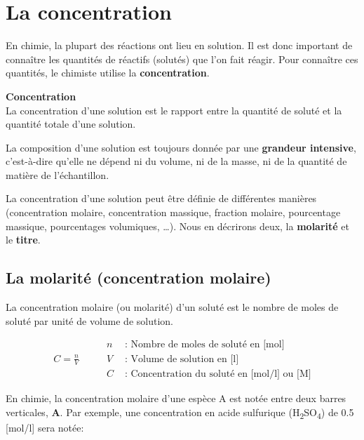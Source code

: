 \documentclass[
  11pt,
  french,
  a4paper,
  openany]{book}
\begin{document}
\newpage

\hypertarget{la-concentration}{%
\section{La concentration}\label{la-concentration}}

En chimie, la plupart des réactions ont lieu en solution. Il est donc important de connaître les quantités de réactifs (solutés) que l'on fait réagir. Pour connaître ces quantités, le chimiste utilise la \textbf{concentration}.

\begin{tcolorbox}
\textbf{Concentration}\\
La concentration d'une solution est le rapport entre la quantité de soluté et la quantité totale d'une solution.

\end{tcolorbox}

La composition d'une solution est toujours donnée par une \textbf{grandeur intensive}, c'est-à-dire qu'elle ne dépend ni du volume, ni de la masse, ni de la quantité de matière de l'échantillon.

La concentration d'une solution peut être définie de différentes manières (concentration molaire, concentration massique, fraction molaire, pourcentage massique, pourcentages volumiques, \ldots). Nous en décrirons deux, la \textbf{molarité} et le \textbf{titre}.

\hypertarget{la-molarituxe9-concentration-molaire}{%
\subsection{La molarité (concentration molaire)}\label{la-molarituxe9-concentration-molaire}}

La concentration molaire (ou molarité) d'un soluté est le nombre de moles de soluté par unité de volume de solution.

\[
\begin{split}
  C = \frac{n}{V}
\end{split}
\qquad
\begin{split}
  n &\text{ : Nombre de moles de soluté en [mol]} \\
  V &\text{ : Volume de solution en [l]} \\
  C &\text{ : Concentration du soluté en [mol/l] ou [M]}
\end{split}
\]

En chimie, la concentration molaire d'une espèce A est notée entre deux barres verticales, \textbf{\textbar A\textbar{}}. Par exemple, une concentration en acide sulfurique (H\textsubscript{2}SO\textsubscript{4}) de 0.5 {[}mol/l{]} sera notée:
\end{document}
